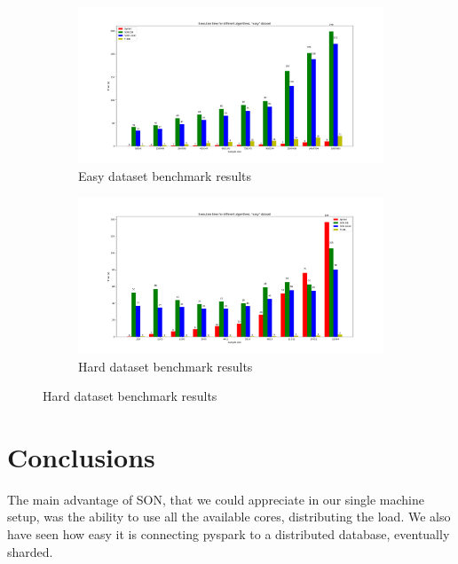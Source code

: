 \documentclass[a4paper]{article}
\begin{document}
	\begin{figure}[h]
		\centering
		\begin{subfigure}[b]{1\textwidth}
			\centering
			\includegraphics[width=\textwidth]{benchmarkeasy.png}
         	\caption{Easy dataset benchmark results}
         	\label{fig:easybenchmark}
		\end{subfigure}
		\hfill
		
		\begin{subfigure}[b]{1\textwidth}
			\centering
			\includegraphics[width=\textwidth]{benchmarkhard.png}
         	\caption{Hard dataset benchmark results}
         	\label{fig:hardbenchmark}
		\end{subfigure}
		\hfill
		
	\end{figure}

	
	\section{Conclusions}
	The main advantage of SON, that we could appreciate in our single machine setup, was the ability to use all the available cores, distributing the load. We also have seen how easy it is connecting pyspark 
	to a distributed database, eventually sharded.\\
	
\end{document}
